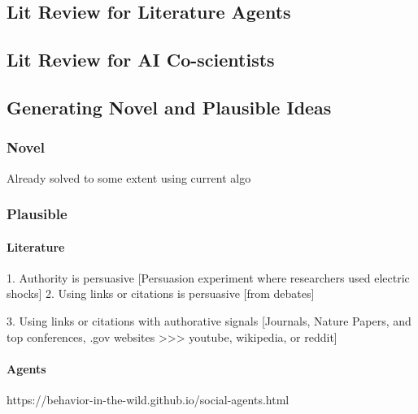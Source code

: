 \subsection{Lit Review for Literature Agents}    

\subsection{Lit Review for AI Co-scientists}

\subsection{Generating Novel and Plausible Ideas}
\subsubsection{Novel}
Already solved to some extent using current algo

\subsubsection{Plausible}
\paragraph{Literature}
1. Authority is persuasive [Persuasion experiment where researchers used electric shocks]
2. Using links or citations is persuasive [from debates]

3. Using links or citations with authorative signals 
[Journals, Nature Papers, and top conferences, .gov websites >>> youtube, wikipedia, or reddit]

\paragraph{Agents}
https://behavior-in-the-wild.github.io/social-agents.html
